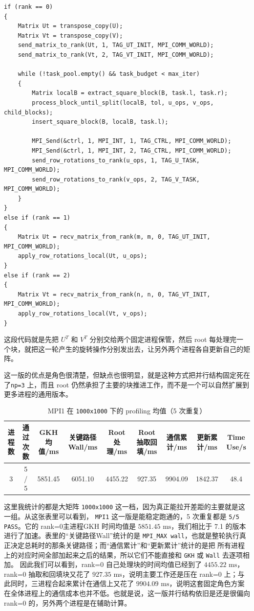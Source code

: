\documentclass[12pt,a4paper,fontset=none]{ctexart}
\begin{document}
\begin{lstlisting}
if (rank == 0)
{
    Matrix Ut = transpose_copy(U);
    Matrix Vt = transpose_copy(V);
    send_matrix_to_rank(Ut, 1, TAG_UT_INIT, MPI_COMM_WORLD);
    send_matrix_to_rank(Vt, 2, TAG_VT_INIT, MPI_COMM_WORLD);

    while (!task_pool.empty() && task_budget < max_iter)
    {
        Matrix localB = extract_square_block(B, task.l, task.r);
        process_block_until_split(localB, tol, u_ops, v_ops, child_blocks);
        insert_square_block(B, localB, task.l);

        MPI_Send(&ctrl, 1, MPI_INT, 1, TAG_CTRL, MPI_COMM_WORLD);
        MPI_Send(&ctrl, 1, MPI_INT, 2, TAG_CTRL, MPI_COMM_WORLD);
        send_row_rotations_to_rank(u_ops, 1, TAG_U_TASK, MPI_COMM_WORLD);
        send_row_rotations_to_rank(v_ops, 2, TAG_V_TASK, MPI_COMM_WORLD);
    }
}
else if (rank == 1)
{
    Matrix Ut = recv_matrix_from_rank(m, m, 0, TAG_UT_INIT, MPI_COMM_WORLD);
    apply_row_rotations_local(Ut, u_ops);
}
else if (rank == 2)
{
    Matrix Vt = recv_matrix_from_rank(n, n, 0, TAG_VT_INIT, MPI_COMM_WORLD);
    apply_row_rotations_local(Vt, v_ops);
}
\end{lstlisting}

这段代码就是先把 \(U^T\) 和 \(V^T\) 分别交给两个固定进程保管，然后 root 每处理完一个块，就把这一轮产生的旋转操作分别发出去，让另外两个进程各自更新自己的矩阵。

这一版的优点是角色很清楚，但缺点也很明显，就是这种方式把并行结构固定死在了\texttt{np=3} 上，而且 root 仍然承担了主要的块推进工作，而不是一个可以自然扩展到更多进程的通用版本。

\begin{table}[H]
    \centering
    \scriptsize
    \caption{MPI1 在 \texttt{1000x1000} 下的 profiling 均值（5 次重复）}
    \label{tab:mpi1-results-slot}
    \begin{tabular}{ccccccccc}
        \toprule
        进程数 & 通过次数 & GKH均值/ms & 关键路径Wall/ms & Root处理/ms & Root抽取回填/ms & 通信累计/ms & 更新累计/ms & Time Use/s \\
        \midrule
        3 & 5 / 5 & 5851.45 & 6051.10 & 4455.22 & 927.35 & 9904.09 & 1842.37 & 48.4 \\
        \bottomrule
    \end{tabular}
\end{table}

这里我统计的都是大矩阵 \texttt{1000x1000} 这一档，因为真正能拉开差距的主要就是这一组。从这张表里可以看到，
\texttt{MPI1} 这一版是能稳定跑通的，5 次重复都是 \texttt{5/5 PASS}。它的 rank=0主进程GKH 时间均值是
\(5851.45\text{ ms}\)，我们相比于 7.1 的版本进行了加速。表里的“关键路径Wall”统计的是
\texttt{MPI\_MAX wall}，也就是整轮执行真正决定总耗时的那条关键路径；而“通信累计”和“更新累计”统计的是把
所有进程上的对应时间全部加起来之后的结果，所以它们不能直接和 \texttt{GKH} 或 \texttt{Wall} 去逐项相加。
因此我们可以看到，rank=0 自己处理块的时间均值已经到了 \(4455.22\text{ ms}\)，
rank=0 抽取和回填块又花了 \(927.35\text{ ms}\)，说明主要工作还是压在 rank=0 上；与此同时，三进程合起来累计在通信上又花了
\(9904.09\text{ ms}\)，说明这套固定角色方案在全体进程上的通信成本也并不低。也就是说，这一版并行结构依旧是还是很偏向 rank=0 的，另外两个进程是在辅助计算。
\end{document}
